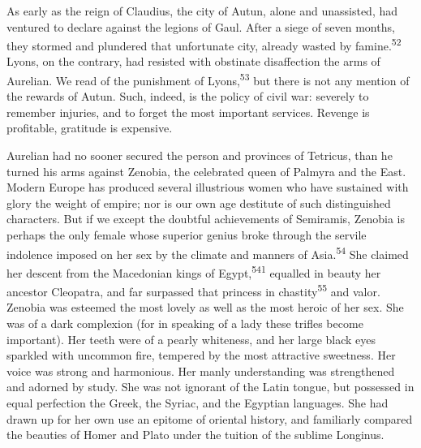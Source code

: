 

As early as the reign of Claudius, the city
of Autun, alone and unassisted, had ventured to declare against
the legions of Gaul. After a siege of seven months, they stormed
and plundered that unfortunate city, already wasted by famine.\textsuperscript{52}
Lyons, on the contrary, had resisted with obstinate disaffection
the arms of Aurelian. We read of the punishment of Lyons,\textsuperscript{53} but
there is not any mention of the rewards of Autun. Such, indeed,
is the policy of civil war: severely to remember injuries, and to
forget the most important services. Revenge is profitable,
gratitude is expensive.



Aurelian had no sooner secured the person and provinces of
Tetricus, than he turned his arms against Zenobia, the celebrated
queen of Palmyra and the East. Modern Europe has produced several
illustrious women who have sustained with glory the weight of
empire; nor is our own age destitute of such distinguished
characters. But if we except the doubtful achievements of
Semiramis, Zenobia is perhaps the only female whose superior
genius broke through the servile indolence imposed on her sex by
the climate and manners of Asia.\textsuperscript{54} She claimed her descent from
the Macedonian kings of Egypt,\textsuperscript{541} equalled in beauty her
ancestor Cleopatra, and far surpassed that princess in chastity\textsuperscript{55}
and valor. Zenobia was esteemed the most lovely as well as the
most heroic of her sex. She was of a dark complexion (for in
speaking of a lady these trifles become important). Her teeth
were of a pearly whiteness, and her large black eyes sparkled
with uncommon fire, tempered by the most attractive sweetness.
Her voice was strong and harmonious. Her manly understanding was
strengthened and adorned by study. She was not ignorant of the
Latin tongue, but possessed in equal perfection the Greek, the
Syriac, and the Egyptian languages. She had drawn up for her own
use an epitome of oriental history, and familiarly compared the
beauties of Homer and Plato under the tuition of the sublime
Longinus.

